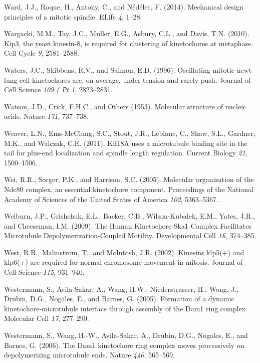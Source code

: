 \documentclass[12pt,a4paper,twoside,openright]{book}
\begin{document}
\hypertarget{ref-Ward2014}{}
Ward, J.J., Roque, H., Antony, C., and Nédélec, F. (2014). Mechanical
design principles of a mitotic spindle. ELife \emph{4}, 1--28.

\hypertarget{ref-Wargacki2010}{}
Wargacki, M.M., Tay, J.C., Muller, E.G., Asbury, C.L., and Davis, T.N.
(2010). Kip3, the yeast kinesin-8, is required for clustering of
kinetochores at metaphase. Cell Cycle \emph{9}, 2581--2588.

\hypertarget{ref-Waters1996a}{}
Waters, J.C., Skibbens, R.V., and Salmon, E.D. (1996). Oscillating
mitotic newt lung cell kinetochores are, on average, under tension and
rarely push. Journal of Cell Science \emph{109 ( Pt 1}, 2823--2831.

\hypertarget{ref-watson1953molecular}{}
Watson, J.D., Crick, F.H.C., and Others (1953). Molecular structure of
nucleic acids. Nature \emph{171}, 737--738.

\hypertarget{ref-Weaver2011}{}
Weaver, L.N., Ems-McClung, S.C., Stout, J.R., Leblanc, C., Shaw, S.L.,
Gardner, M.K., and Walczak, C.E. (2011). Kif18A uses a microtubule
binding site in the tail for plus-end localization and spindle length
regulation. Current Biology \emph{21}, 1500--1506.

\hypertarget{ref-Wei2005}{}
Wei, R.R., Sorger, P.K., and Harrison, S.C. (2005). Molecular
organization of the Ndc80 complex, an essential kinetochore component.
Proceedings of the National Academy of Sciences of the United States of
America \emph{102}, 5363--5367.

\hypertarget{ref-Welburn2009}{}
Welburn, J.P., Grishchuk, E.L., Backer, C.B., Wilson-Kubalek, E.M.,
Yates, J.R., and Cheeseman, I.M. (2009). The Human Kinetochore Ska1
Complex Facilitates Microtubule Depolymerization-Coupled Motility.
Developmental Cell \emph{16}, 374--385.

\hypertarget{ref-West2002}{}
West, R.R., Malmstrom, T., and McIntosh, J.R. (2002). Kinesins klp5(+)
and klp6(+) are required for normal chromosome movement in mitosis.
Journal of Cell Science \emph{115}, 931--940.

\hypertarget{ref-Westermann2005}{}
Westermann, S., Avila-Sakar, A., Wang, H.W., Niederstrasser, H., Wong,
J., Drubin, D.G., Nogales, E., and Barnes, G. (2005). Formation of a
dynamic kinetochore-microtubule interface through assembly of the Dam1
ring complex. Molecular Cell \emph{17}, 277--290.

\hypertarget{ref-Westermann2006}{}
Westermann, S., Wang, H.-W., Avila-Sakar, A., Drubin, D.G., Nogales, E.,
and Barnes, G. (2006). The Dam1 kinetochore ring complex moves
processively on depolymerizing microtubule ends. Nature \emph{440},
565--569.
\end{document}
